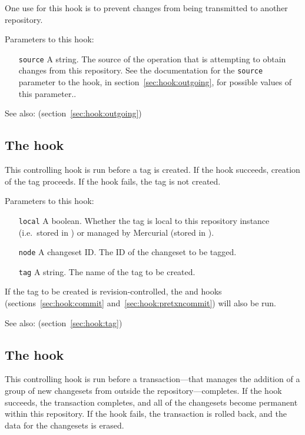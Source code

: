 One use for this hook is to prevent changes from being transmitted to
another repository.

Parameters to this hook:
\begin{itemize}
\item[\texttt{source}] A string.  The source of the operation that is
  attempting to obtain changes from this repository.  See the
  documentation for the \texttt{source} parameter to the
   hook, in section~\ref{sec:hook:outgoing}, for
  possible values of this parameter..
\end{itemize}

See also:  (section~\ref{sec:hook:outgoing})

\subsection{The  hook}
\label{sec:hook:pretag}

This controlling hook is run before a tag is created.  If the hook
succeeds, creation of the tag proceeds.  If the hook fails, the tag is
not created.

Parameters to this hook:
\begin{itemize}
\item[\texttt{local}] A boolean.  Whether the tag is local to this
  repository instance (i.e.~stored in ) or managed
  by Mercurial (stored in ).
\item[\texttt{node}] A changeset ID.  The ID of the changeset to be tagged.
\item[\texttt{tag}] A string.  The name of the tag to be created.
\end{itemize}

If the tag to be created is revision-controlled, the 
and  hooks (sections~\ref{sec:hook:commit}
and~\ref{sec:hook:pretxncommit}) will also be run.

See also:  (section~\ref{sec:hook:tag})

\subsection{The  hook}
\label{sec:hook:pretxnchangegroup}

This controlling hook is run before a transaction---that manages the
addition of a group of new changesets from outside the
repository---completes.  If the hook succeeds, the transaction
completes, and all of the changesets become permanent within this
repository.  If the hook fails, the transaction is rolled back, and
the data for the changesets is erased.

